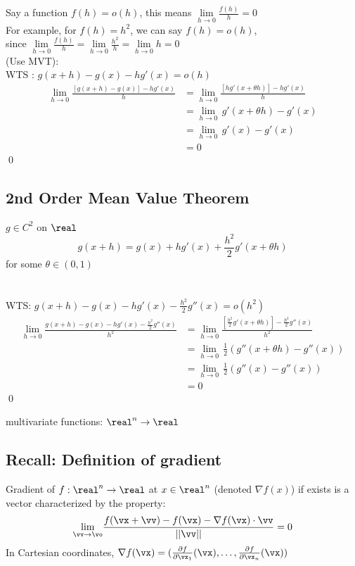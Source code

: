 \documentclass[11pt]{article}
\begin{document}
\noindent Say a function $f(h) = o(h)$, this means $\underset{h \rightarrow 0}{\lim} \frac{f(h)}{h} = 0$\\
For example, for $f(h) = h^2$, we can say $f(h) = o(h)$, \\
since $\underset{h \rightarrow 0}{\lim} \frac{f(h)}{h} = \underset{h \rightarrow 0}{\lim} \frac{h^2}{h} = \underset{h \rightarrow 0}{\lim} h = 0$\\
 (Use MVT): \\
WTS : $g(x+h) - g(x) - hg'(x) = o(h)$
\begin{align*}
	\underset{h \rightarrow 0}{\lim} \frac{[g(x+h) - g(x)] - hg'(x)}{h} &= \underset{h \rightarrow 0}{\lim} \frac{[hg'(x+\theta h)] - hg'(x)}{h} \\
	&=\underset{h \rightarrow 0}{\lim} \, g'(x + \theta h) - g'(x) \\
	&=\underset{h \rightarrow 0}{\lim} \, g'(x) - g'(x) \\
	&= 0
\end{align*}
\qed

\subsection{2nd Order Mean Value Theorem}
$g \in C^2$ on $\real$
$$g(x + h) = g(x) + hg'(x) + \frac{h^2}{2} g'(x+\theta h)$$
for some $\theta \in (0,1)$ \\\\
 \\
WTS: $g(x+h) - g(x) - hg'(x) - \frac{h^2}{2}g''(x) = o(h^2)$
\begin{align*}
	\underset{h \rightarrow 0}{\lim} \frac{g(x+h) - g(x) - hg'(x) - \frac{h^2}{2}g''(x)}{h^2}
	&= \underset{h \rightarrow 0}{\lim} \frac{[\frac{h^2}{2}g'(x+\theta h)] - \frac{h^2}{2}g''(x)}{h^2}\\
	&=\underset{h \rightarrow 0}{\lim}\, \frac{1}{2}(g''(x+\theta h) - g''(x)) \\
	&=\underset{h \rightarrow 0}{\lim}\, \frac{1}{2}(g''(x) - g''(x)) \\
	&= 0
\end{align*}
\qed

multivariate functions: $\real^n \rightarrow \real$
\subsection{Recall: Definition of gradient}
Gradient of $f: \real^n \rightarrow \real$ at $x \in \real^n$ (denoted $\nabla f(x)$) if exists is a vector characterized by the property:
$$\underset{\vv \rightarrow \vo}{\lim} \frac{f(\vx+\vv)-f(\vx) - \nabla f(\vx) \cdot \vv}{||\vv||} = 0$$
In Cartesian coordinates, $\nabla f(\vx) = (\frac{\partial f}{\partial \vx_1}(\vx), \hdots, \frac{\partial f}{\partial \vx_n}(\vx))$
\end{document}
